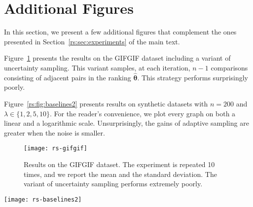 \section{Additional Figures}  %
\label{rs:app:figures}

In this section, we present a few additional figures that complement the ones presented in Section~\ref{rs:sec:experiments} of the main text.

Figure~\ref{rs:fig:gifgif} presents the results on the GIFGIF dataset including a variant of uncertainty sampling.
This variant samples, at each iteration, $n-1$ comparisons consisting of adjacent pairs in the ranking $\hat{\bm{\theta}}$.
This strategy performs surprisingly poorly.

Figure~\ref{rs:fig:baselines2} presents results on synthetic datasets with $n = 200$ and $\lambda \in \{ 1, 2, 5, 10 \}$.
For the reader's convenience, we plot every graph on both a linear and a logarithmic scale.
Unsurprisingly, the gains of adaptive sampling are greater when the noise is smaller.

\begin{figure}[t]
\centering
\texttt{[image: rs-gifgif]}
\caption{
Results on the GIFGIF dataset.
The experiment is repeated \num{10} times, and we report the mean and the standard deviation.
The variant of uncertainty sampling performs extremely poorly.
}
\label{rs:fig:gifgif}
\end{figure}


\begin{figure*}[t]
\centering
\texttt{[image: rs-baselines2]}
\caption{
Results on synthetic datasets for $n = 200$ and increasing values of $\lambda$.
Every experiment is repeated \num{10} times, and we report the mean and the standard deviation.
}
\label{rs:fig:baselines2}
\end{figure*}
